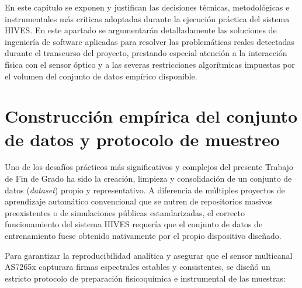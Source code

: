 
En este capítulo se exponen y justifican las decisiones técnicas, metodológicas e instrumentales más críticas adoptadas durante la ejecución práctica del sistema HIVES. En este apartado se argumentarán detalladamente las soluciones de ingeniería de software aplicadas para resolver las problemáticas reales detectadas durante el transcurso del proyecto, prestando especial atención a la interacción física con el sensor óptico y a las severas restricciones algorítmicas impuestas por el volumen del conjunto de datos empírico disponible.

\section{Construcción empírica del conjunto de datos y protocolo de muestreo}

Uno de los desafíos prácticos más significativos y complejos del presente Trabajo de Fin de Grado ha sido la creación, limpieza y consolidación de un conjunto de datos (\textit{dataset}) propio y representativo. A diferencia de múltiples proyectos de aprendizaje automático convencional que se nutren de repositorios masivos preexistentes o de simulaciones públicas estandarizadas, el correcto funcionamiento del sistema HIVES requería que el conjunto de datos de entrenamiento fuese obtenido nativamente por el propio dispositivo diseñado.

Para garantizar la reproducibilidad analítica y asegurar que el sensor multicanal AS7265x capturara firmas espectrales estables y consistentes, se diseñó un estricto protocolo de preparación fisicoquímica e instrumental de las muestras:

